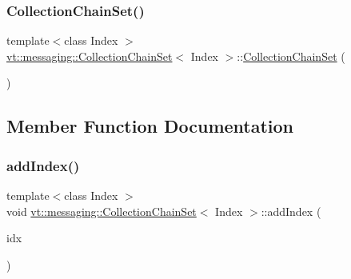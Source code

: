 \mbox{\label{classvt_1_1messaging_1_1_collection_chain_set_a21be566436c86fa59a02a1bd073a9e48}} 
\subsubsection{\texorpdfstring{Collection\+Chain\+Set()}{CollectionChainSet()}\hspace{0.1cm}{\footnotesize\ttfamily [3/3]}}
{\footnotesize\ttfamily template$<$class Index $>$ \\
\hyperlink{classvt_1_1messaging_1_1_collection_chain_set}{vt\+::messaging\+::\+Collection\+Chain\+Set}$<$ Index $>$\+::\hyperlink{classvt_1_1messaging_1_1_collection_chain_set}{Collection\+Chain\+Set} (\begin{DoxyParamCaption}\item[{\hyperlink{classvt_1_1messaging_1_1_collection_chain_set}{Collection\+Chain\+Set}$<$ Index $>$ \&\&}]{ }\end{DoxyParamCaption})\hspace{0.3cm}{\ttfamily [delete]}}



\subsection{Member Function Documentation}
\mbox{\label{classvt_1_1messaging_1_1_collection_chain_set_aefc11c9b011b4916c3b80dfc8f776239}} 
\subsubsection{\texorpdfstring{add\+Index()}{addIndex()}}
{\footnotesize\ttfamily template$<$class Index $>$ \\
void \hyperlink{classvt_1_1messaging_1_1_collection_chain_set}{vt\+::messaging\+::\+Collection\+Chain\+Set}$<$ Index $>$\+::add\+Index (\begin{DoxyParamCaption}\item[{Index}]{idx }\end{DoxyParamCaption})\hspace{0.3cm}{\ttfamily [inline]}}



